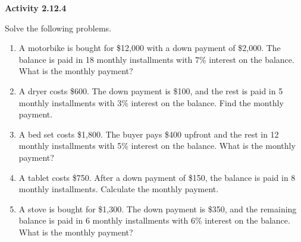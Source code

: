 \noindent\textbf{Activity 2.12.4}


Solve the following problems. 
\begin{enumerate}[noitemsep, label = \color{blue}\arabic*. ]
    \item A motorbike is bought for \$12,000 with a down payment of \$2,000. The balance is paid in 18 monthly installments with 7\% interest on the balance. What is the monthly payment?
    \item A dryer costs \$600. The down payment is \$100, and the rest is paid in 5 monthly installments with 3\% interest on the balance. Find the monthly payment.
    \item A bed set costs \$1,800. The buyer pays \$400 upfront and the rest in 12 monthly installments with 5\% interest on the balance. What is the monthly payment?
    \item A tablet costs \$750. After a down payment of \$150, the balance is paid in 8 monthly installments. Calculate the monthly payment.
    \item A stove is bought for \$1,300. The down payment is \$350, and the remaining balance is paid in 6 monthly installments with 6\% interest on the balance. What is the monthly payment?
\end{enumerate}


